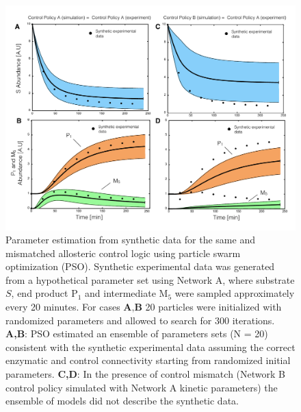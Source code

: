 \documentclass[processes,article,accept,moreauthors,pdftex,12pt,a4paper]{mdpi}
\begin{document}
\begin{figure}[H]
\centering
\includegraphics[width=1.0\textwidth]{./figs/Figure-5-ParameterFit.pdf}
\caption{Parameter estimation from synthetic data for the same and mismatched allosteric control logic using particle swarm optimization (PSO). 
Synthetic experimental data was generated from a hypothetical parameter set using Network A, 
where substrate $S$, end product P$_{1}$ and intermediate M$_5$ were sampled approximately every 20 minutes. 
For cases $\textbf{A,B}$ 20 particles were initialized with randomized parameters and allowed to search for 300 iterations. 
\textbf{A,B}: PSO estimated an ensemble of parameters sets (N = 20) consistent with the synthetic experimental data assuming the correct
enzymatic and control connectivity starting from randomized initial parameters.
\textbf{C,D}: In the presence of control mismatch (Network B control policy simulated with Network A kinetic parameters) 
the ensemble of models did not describe the synthetic data. 
}\label{fig-parameter-fit}
\end{figure}
\end{document}

